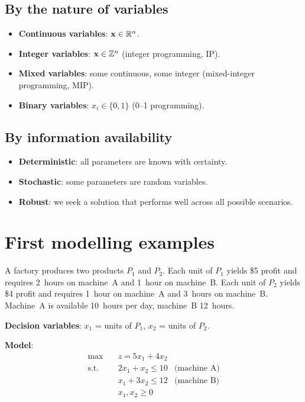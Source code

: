 \subsection{By the nature of variables}

\begin{itemize}
  \item \textbf{Continuous variables}: $\mathbf{x} \in \mathbb{R}^n$.
  \item \textbf{Integer variables}: $\mathbf{x} \in \mathbb{Z}^n$ (integer
        programming, IP).
  \item \textbf{Mixed variables}: some continuous, some integer (mixed-integer
        programming, MIP).
  \item \textbf{Binary variables}: $x_i \in \{0, 1\}$ (0--1 programming).
\end{itemize}

\subsection{By information availability}

\begin{itemize}
  \item \textbf{Deterministic}: all parameters are known with certainty.
  \item \textbf{Stochastic}: some parameters are random variables.
  \item \textbf{Robust}: we seek a solution that performs well across all
        possible scenarios.
\end{itemize}

\section{First modelling examples}

\begin{example}
A factory produces two products $P_1$ and $P_2$.  Each unit of $P_1$ yields
\$5 profit and requires 2~hours on machine~A and 1~hour on machine~B.  Each
unit of $P_2$ yields \$4 profit and requires 1~hour on machine~A and 3~hours
on machine~B.  Machine~A is available 10~hours per day, machine~B 12~hours.

\textbf{Decision variables}:
$x_1$ = units of $P_1$, $x_2$ = units of $P_2$.

\textbf{Model}:
\[
\begin{aligned}
  \max \quad & z = 5x_1 + 4x_2 \\
  \text{s.t.} \quad
    & 2x_1 + x_2 \le 10 & \text{(machine A)} \\
    & x_1 + 3x_2 \le 12  & \text{(machine B)} \\
    & x_1, x_2 \ge 0
\end{aligned}
\]
\end{example}

